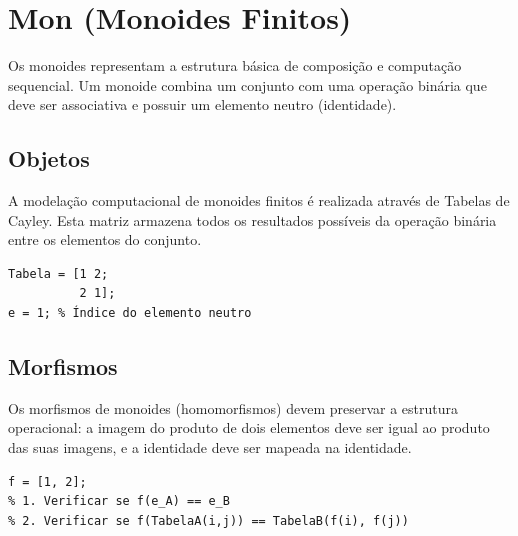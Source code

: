 \section{Mon (Monoides Finitos)}

Os monoides representam a estrutura básica de composição e computação sequencial. Um monoide combina um conjunto com uma operação binária que deve ser associativa e possuir um elemento neutro (identidade).

\subsection{Objetos}
A modelação computacional de monoides finitos é realizada através de Tabelas de Cayley. Esta matriz armazena todos os resultados possíveis da operação binária entre os elementos do conjunto.

\begin{lstlisting}[caption={Tabela de Cayley para Monoide C2}]
% Elementos: 1 (Identidade), 2
Tabela = [1 2; 
          2 1];
e = 1; % Índice do elemento neutro
\end{lstlisting}

\subsection{Morfismos}
Os morfismos de monoides (homomorfismos) devem preservar a estrutura operacional: a imagem do produto de dois elementos deve ser igual ao produto das suas imagens, e a identidade deve ser mapeada na identidade.

\begin{lstlisting}[caption={Validação de Homomorfismo}]
f = [1, 2];
% 1. Verificar se f(e_A) == e_B
% 2. Verificar se f(TabelaA(i,j)) == TabelaB(f(i), f(j))
\end{lstlisting}